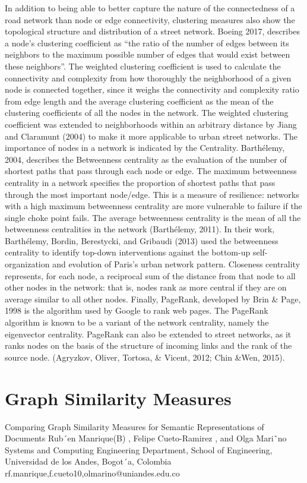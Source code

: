 In addition to being able to better capture the nature of the connectedness of a road network than node or edge connectivity, clustering measures also show the topological structure and distribution of a street network. Boeing 2017, describes a node’s clustering coefficient as “the ratio of the number of edges between its neighbors to the maximum possible number of edges that would exist between these neighbors”. The weighted clustering coefficient is used to calculate the connectivity and complexity from how thoroughly the neighborhood of a given node is connected together, since it weighs the connectivity and complexity ratio from edge length and the average clustering coefficient as the mean of the clustering coefficients of all the nodes in the network. The weighted clustering coefficient was extended to neighborhoods within an arbitrary distance by Jiang and Claramunt (2004) to make it more applicable to urban street networks. The importance of nodes in a network is indicated by the Centrality. Barthélemy, 2004, describes the Betweenness centrality as the evaluation of the number of shortest paths that pass through each node or edge. The maximum betweenness centrality in a network specifies the  proportion of shortest paths that pass through the most important node/edge. This is a measure of resilience: networks with a high maximum betweenness centrality are more vulnerable to failure if the single choke point fails. The average betweenness centrality is the mean of all the betweenness centralities in the network (Barthélemy, 2011). In their work, Barthélemy, Bordin, Berestycki, and Gribaudi (2013) used the betweenness centrality to identify top-down interventions against the bottom-up self-organization and evolution of Paris's urban network pattern. Closeness centrality represents, for each node, a reciprocal sum of the distance from that node to all other nodes in the network: that is, nodes rank as more central if they are on average similar to all other nodes. Finally, PageRank, developed by Brin & Page, 1998 is the algorithm used by Google to rank web pages. The PageRank algorithm is known to be a variant of the network centrality, namely the eigenvector centrality. PageRank can also be extended to street networks, as it ranks nodes on the basis of the structure of incoming links and the rank of the source node. (Agryzkov, Oliver, Tortosa, \& Vicent, 2012; Chin &Wen, 2015).


\section{Graph Similarity Measures}
Comparing Graph Similarity Measures for Semantic Representations of Documents Rub´en Manrique(B) , Felipe Cueto-Ramirez , and Olga Mari˜no Systems and Computing Engineering Department, School of Engineering, Universidad de los Andes, Bogot´a, Colombia {rf.manrique,f.cueto10,olmarino}@uniandes.edu.co

